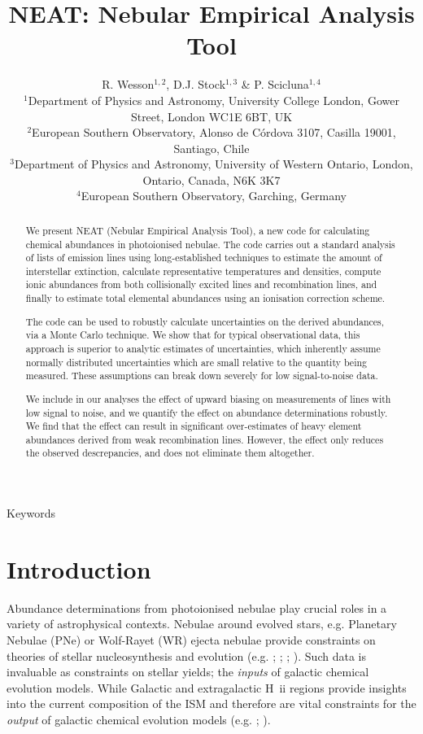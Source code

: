 \documentclass[useAMS,usenatbib]{mn2e}
\title[NEAT]{NEAT: Nebular Empirical Analysis Tool} %
\author[R. Wesson et al.]{R. Wesson$^{1,2}$, D.J. Stock$^{1,3}$ \& P. Scicluna$^{1,4}$\\
$^1$Department of Physics and Astronomy, University College London, Gower Street, London WC1E 6BT, UK\\
$^2$European Southern Observatory, Alonso de C\'ordova 3107, Casilla 19001, Santiago, Chile\\
$^3$Department of Physics and Astronomy, University of Western Ontario, London, Ontario, Canada, N6K 3K7\\
$^4$European Southern Observatory, Garching, Germany\\ %
}
\begin{document}
\date{}

\pagerange{\pageref{firstpage}--\pageref{lastpage}} 

\maketitle

\label{firstpage}

\begin{abstract}
We present NEAT (Nebular Empirical Analysis Tool), a new code for calculating chemical abundances in photoionised nebulae.  The code carries out a standard analysis of lists of emission lines using long-established techniques to estimate the amount of interstellar extinction, calculate representative temperatures and densities, compute ionic abundances from both collisionally excited lines and recombination lines, and finally to estimate total elemental abundances using an ionisation correction scheme.

The code can be used to robustly calculate uncertainties on the derived abundances, via a Monte Carlo technique.  We show that for typical observational data, this approach is superior to analytic estimates of uncertainties, which inherently assume normally distributed uncertainties which are small relative to the quantity being measured.  These assumptions can break down severely for low signal-to-noise data.

We include in our analyses the effect of upward biasing on measurements of lines with low signal to noise, and we quantify the effect on abundance determinations robustly.  We find that the effect can result in significant over-estimates of heavy element abundances derived from weak recombination lines.  However, the effect only reduces the observed descrepancies, and does not eliminate them altogether.

\end{abstract}

\begin{keywords}
Keywords
\end{keywords}

\section{Introduction}

Abundance determinations from photoionised nebulae play crucial roles in a variety of astrophysical contexts. Nebulae around evolved stars, e.g. Planetary Nebulae (PNe) or Wolf-Rayet (WR) ejecta nebulae provide constraints on theories of stellar nucleosynthesis and evolution (e.g. \citealt{2009ApJ...690.1130K};  \citealt{2011arXiv1110.1186M}; \citealt{1992A&A...264..105M}; \citealt{2011MNRAS.tmp.1754S}). Such data is invaluable as constraints on stellar yields; the \textit{inputs} of galactic chemical evolution models. While Galactic and extragalactic H~{\sc ii} regions provide insights into the current composition of the ISM and therefore are vital constraints for the \textit{output} of galactic chemical evolution models (e.g. \citealt{1997nceg.book.....P}; \citealt{2003ceg..book.....M}).
\end{document}
